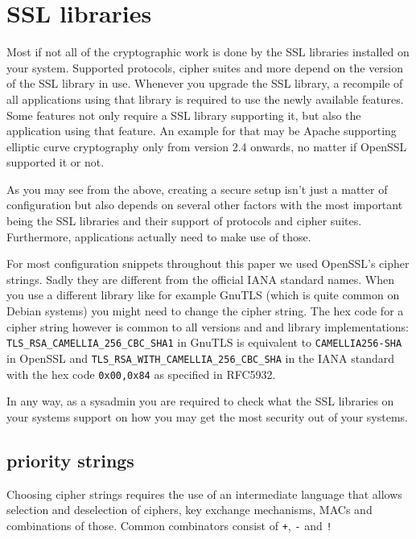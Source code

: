 \section{SSL libraries}
\label{section:ssllibs}

Most if not all of the cryptographic work is done by the SSL libraries installed on
your system. Supported protocols, cipher suites and more depend on the version of
the SSL library in use. Whenever you upgrade the SSL library, a recompile of all
applications using that library is required to use the newly available features.
Some features not only require a SSL library supporting it, but also the application
using that feature. An example for that may be Apache supporting elliptic curve
cryptography only from version 2.4 onwards, no matter if OpenSSL supported it or
not.

As you may see from the above, creating a secure setup isn't just a matter of
configuration but also depends on several other factors with the most important
being the SSL libraries and their support of protocols and cipher suites.
Furthermore, applications actually need to make use of those.

For most configuration snippets throughout this paper we used OpenSSL's cipher
strings. Sadly they are different from the official IANA standard names. When you
use a different library like for example GnuTLS (which is quite common on Debian
systems) you might need to change the cipher string. The hex code for a cipher
string however is common to all versions and and library implementations:
\texttt{TLS\_RSA\_CAMELLIA\_256\_CBC\_SHA1} in GnuTLS is equivalent to
\texttt{CAMELLIA256-SHA} in OpenSSL and \texttt{TLS\_RSA\_WITH\_CAMELLIA\_256\_CBC\_SHA}
in the IANA standard with the hex code \texttt{0x00,0x84} as specified
in RFC5932\cite{rfc5932}.

In any way, as a sysadmin you are required to check what the SSL libraries on
your systems support on how you may get the most security out of your systems.

\subsection{priority strings}

Choosing cipher strings requires the use of an intermediate language that allows selection
and deselection of ciphers, key exchange mechanisms, MACs and combinations of those.
Common combinators consist of \texttt{+}, \texttt{-} and \texttt{!}

